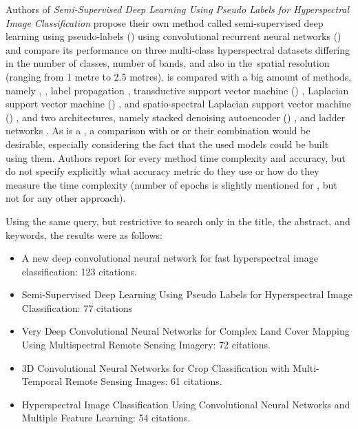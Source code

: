 Authors of \textit{Semi-Supervised Deep Learning Using Pseudo Labels for Hyperspectral Image Classification} propose their own method called semi-supervised deep learning using pseudo-labels () using convolutional recurrent neural networks () and compare its performance on three multi-class hyperspectral datasets differing in the number of classes, number of bands, and also in the~spatial resolution (ranging from 1 metre to 2.5 metres).  is compared with a big amount of  methods, namely , , label propagation \cite{label-prop}, transductive support vector machine () \cite{tsvm}, Laplacian support vector machine () \cite{lapsvm}, and spatio-spectral Laplacian support vector machine () \cite{ss-lapsvm}, and two  architectures, namely stacked denoising autoencoder () \cite{sda}, and ladder networks \cite{ladder-networks}. As  is a , a comparison with  or  or their combination would be desirable, especially considering the fact that the used  models could be built using them. Authors report for every method time complexity and accuracy, but do not specify explicitly what accuracy metric do they use or how do they measure the time complexity (number of epochs is slightly mentioned for , but not for any other approach).

Using the same query, but restrictive to search only in the title, the abstract, and keywords, the results were as follows:

\begin{itemize}
	\item A new deep convolutional neural network for fast hyperspectral image classification: 123 citations.  \cite{cnn-hs-class}
	\item Semi-Supervised Deep Learning Using Pseudo Labels for Hyperspectral Image Classification: 77 citations \cite{semi-supervised-hyperspectral}
	\item Very Deep Convolutional Neural Networks for Complex Land Cover Mapping Using Multispectral Remote Sensing Imagery: 72 citations. \cite{very-deep-cnn-lc}
	\item 3D Convolutional Neural Networks for Crop Classification with Multi-Temporal Remote Sensing Images: 61 citations. \cite{3d-cnn-crop}
	\item Hyperspectral Image Classification Using Convolutional Neural Networks and Multiple Feature Learning: 54 citations. \cite{hyperspectral-multiple-feat-cnn}
\end{itemize}

